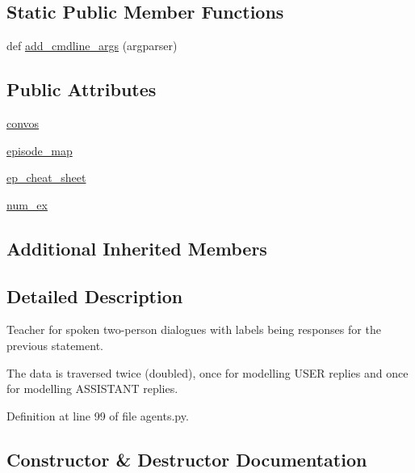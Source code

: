 \subsection*{Static Public Member Functions}
\begin{DoxyCompactItemize}
\item 
def \hyperlink{classparlai_1_1tasks_1_1taskmaster_1_1agents_1_1WozDialogueTeacher_a4af3fe28fd0b7558ddf7ed93c311c722}{add\+\_\+cmdline\+\_\+args} (argparser)
\end{DoxyCompactItemize}
\subsection*{Public Attributes}
\begin{DoxyCompactItemize}
\item 
\hyperlink{classparlai_1_1tasks_1_1taskmaster_1_1agents_1_1WozDialogueTeacher_ae7c9af4478d5e53c4467484838dfd5ba}{convos}
\item 
\hyperlink{classparlai_1_1tasks_1_1taskmaster_1_1agents_1_1WozDialogueTeacher_aa3328a99085735dacfe425013036800f}{episode\+\_\+map}
\item 
\hyperlink{classparlai_1_1tasks_1_1taskmaster_1_1agents_1_1WozDialogueTeacher_a75f5e71661e1d07f68dbfb87ba726400}{ep\+\_\+cheat\+\_\+sheet}
\item 
\hyperlink{classparlai_1_1tasks_1_1taskmaster_1_1agents_1_1WozDialogueTeacher_a27b3ee35b98d89914bc5079d8a6e75aa}{num\+\_\+ex}
\end{DoxyCompactItemize}
\subsection*{Additional Inherited Members}


\subsection{Detailed Description}
\begin{DoxyVerb}Teacher for spoken two-person dialogues with labels being responses for the previous
statement.

The data is traversed twice (doubled), once for modelling USER replies and once for
modelling ASSISTANT replies.
\end{DoxyVerb}
 

Definition at line 99 of file agents.\+py.



\subsection{Constructor \& Destructor Documentation}
\mbox{\label{classparlai_1_1tasks_1_1taskmaster_1_1agents_1_1WozDialogueTeacher_a96c89da471dc6d1983e8c1c509b3be64}} 
